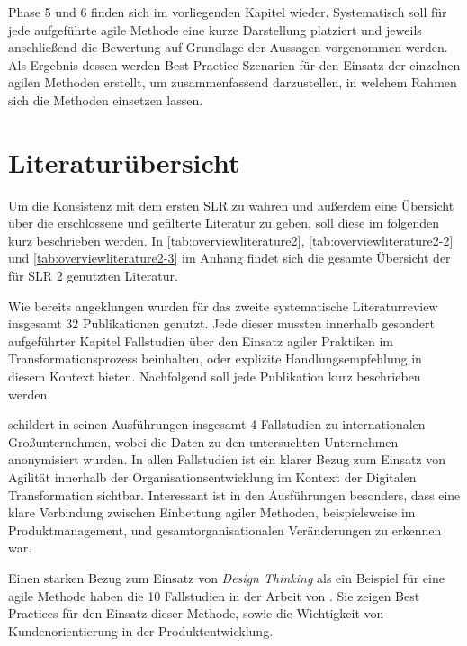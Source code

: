 Phase 5 und 6 finden sich im vorliegenden Kapitel wieder. Systematisch soll für jede aufgeführte agile Methode eine kurze Darstellung platziert und jeweils anschließend die Bewertung auf Grundlage der Aussagen vorgenommen werden. Als Ergebnis dessen werden Best Practice Szenarien für den Einsatz der einzelnen agilen Methoden erstellt, um zusammenfassend darzustellen, in welchem Rahmen sich die Methoden einsetzen lassen.


\section{Literaturübersicht}


Um die Konsistenz mit dem ersten SLR  zu wahren  und außerdem eine Übersicht über die erschlossene und  gefilterte Literatur zu geben, soll diese im folgenden kurz beschrieben werden. In  \ref{tab:overviewliterature2}, \ref{tab:overviewliterature2-2} und \ref{tab:overviewliterature2-3} im Anhang findet sich die  gesamte Übersicht der für SLR 2 genutzten Literatur.

Wie bereits angeklungen wurden für das zweite systematische Literaturreview insgesamt 32 Publikationen genutzt. Jede dieser mussten innerhalb gesondert aufgeführter Kapitel Fallstudien über den Einsatz agiler Praktiken im Transformationsprozess beinhalten, oder explizite Handlungsempfehlung in diesem Kontext bieten. Nachfolgend soll jede Publikation kurz beschrieben werden.

 schildert in seinen Ausführungen insgesamt 4 Fallstudien zu internationalen Großunternehmen, wobei die Daten zu den untersuchten Unternehmen anonymisiert wurden. In allen Fallstudien ist ein klarer Bezug zum Einsatz von Agilität innerhalb der Organisationsentwicklung im Kontext der Digitalen Transformation sichtbar. Interessant ist in den Ausführungen besonders, dass eine klare Verbindung zwischen Einbettung agiler Methoden, beispielsweise im Produktmanagement, und gesamtorganisationalen Veränderungen zu erkennen war.

Einen starken Bezug zum Einsatz von \textit{Design Thinking} als ein Beispiel für eine agile Methode haben die 10 Fallstudien in der Arbeit von . Sie zeigen Best Practices  für den Einsatz dieser Methode, sowie die Wichtigkeit von Kundenorientierung in der Produktentwicklung.

